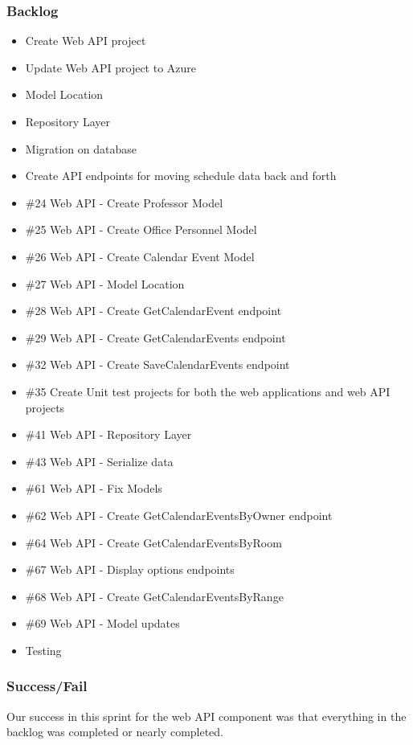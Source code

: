 \subsubsection{Backlog}
\begin{itemize}
\item Create Web API project
\item Update Web API project to Azure
\item Model Location
\item Repository Layer
\item Migration on database
\item Create API endpoints for moving schedule data back and forth
\item \#24 Web API - Create Professor Model
\item \#25 Web API - Create Office Personnel Model
\item \#26 Web API - Create Calendar Event Model
\item \#27 Web API - Model Location
\item \#28 Web API - Create GetCalendarEvent endpoint
\item \#29 Web API - Create GetCalendarEvents endpoint
\item \#32 Web API - Create SaveCalendarEvents endpoint
\item \#35 Create Unit test projects for both the web applications and web API projects
\item \#41 Web API - Repository Layer
\item \#43 Web API - Serialize data
\item \#61 Web API - Fix Models
\item \#62 Web API - Create GetCalendarEventsByOwner endpoint
\item \#64 Web API - Create GetCalendarEventsByRoom
\item \#67 Web API - Display options endpoints
\item \#68 Web API - Create GetCalendarEventsByRange
\item \#69 Web API - Model updates
\item Testing
\end{itemize}

\subsubsection{Success/Fail}
Our success in this sprint for the web API component was that everything in the backlog was completed or nearly  completed.

